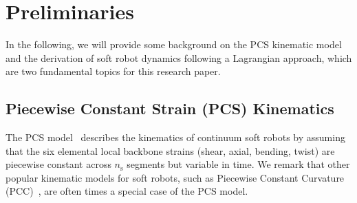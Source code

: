 \section{Preliminaries}
In the following, we will provide some background on the \gls{PCS} kinematic model and the derivation of soft robot dynamics following a Lagrangian approach, which are two fundamental topics for this research paper.

\subsection{Piecewise Constant Strain (PCS) Kinematics}\label{sec:pcsregression:pcs_model}
The \gls{PCS} model~\cite{renda2018discrete} describes the kinematics of continuum soft robots by assuming that the six elemental local backbone strains (shear, axial, bending, twist) are piecewise constant across $n_\mathrm{s}$ segments but variable in time.
We remark that other popular kinematic models for soft robots, such as Piecewise Constant Curvature (PCC)~\cite{webster2010design}, are often times a special case of the \gls{PCS} model.

